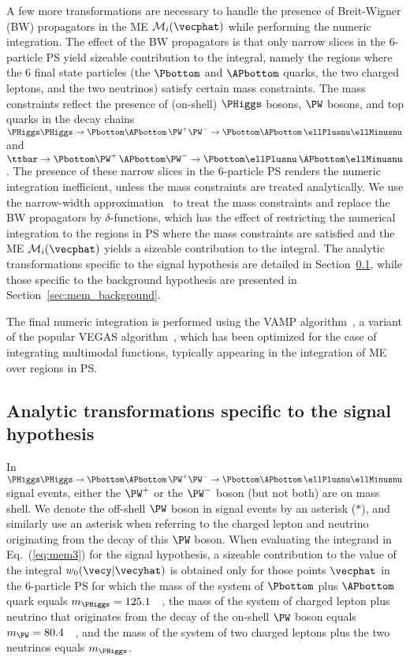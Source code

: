 A few more transformations are necessary to handle the presence of Breit-Wigner (BW) propagators in the ME $\mathcal{M}_{i}(\vecphat)$ while performing the numeric integration.
The effect of the BW propagators is that only narrow slices in the $6$-particle PS yield sizeable contribution to the integral,
namely the regions where the $6$ final state particles (the $\Pbottom$ and $\APbottom$ quarks, the two charged leptons, and the two neutrinos)
satisfy certain mass constraints.
The mass constraints reflect the presence of (on-shell) $\PHiggs$ bosons, $\PW$ bosons, and top quarks in the decay chains
$\PHiggs\PHiggs \to \Pbottom\APbottom \, \PW^{+}\PW^{-} \to \Pbottom\APbottom \, \ellPlusnu\ellMinusnu$ and
$\ttbar \to \Pbottom\PW^{+} \, \APbottom\PW^{-} \to \Pbottom\ellPlusnu \, \APbottom\ellMinusnu$.
The presence of these narrow slices in the $6$-particle PS renders the numeric integration inefficient, unless the mass constraints are treated analytically.
We use the narrow-width approximation~\cite{NWA} to treat the mass constraints and replace the BW propagators by $\delta$-functions,
which has the effect of restricting the numerical integration to the regions in PS where the mass constraints are satisfied
and the ME $\mathcal{M}_{i}(\vecphat)$ yields a sizeable contribution to the integral.
The analytic transformations specific to the signal hypothesis are detailed in Section~\ref{sec:mem_signal},
while those specific to the background hypothesis are presented in Section~\ref{sec:mem_background}.

The final numeric integration is performed using the VAMP algorithm~\cite{VAMP}, a variant of the popular VEGAS algorithm~\cite{VEGAS},
which has been optimized for the case of integrating multimodal functions, typically appearing in the integration of ME over regions in PS.


\subsection{Analytic transformations specific to the signal hypothesis}
\label{sec:mem_signal}

In $\PHiggs\PHiggs \to \Pbottom\APbottom \, \PW^{+}\PW^{-} \to \Pbottom\APbottom \, \ellPlusnu\ellMinusnu$ signal events,
either the $\PW^{+}$ or the $\PW^{-}$ boson (but not both) are on mass shell.
We denote the off-shell $\PW$ boson in signal events by an asterisk ($\ast$),
and similarly use an asterisk when referring to the charged lepton and neutrino originating from the decay of this $\PW$ boson.
When evaluating the integrand in Eq.~(\ref{eq:mem3}) for the signal hypothesis, 
a sizeable contribution to the value of the integral $w_{0}(\vecy|\vecyhat)$ is obtained only for those points $\vecphat$ in the $6$-particle PS for which
the mass of the system of $\Pbottom$ plus $\APbottom$ quark equals $m_{\PHiggs} = 125.1$~\GeV~\cite{HIG-14-042},
the mass of the system of charged lepton plus neutrino that originates from the decay of the on-shell $\PW$ boson equals $m_{\PW} = 80.4$~\GeV~\cite{PDG},
and the mass of the system of two charged leptons plus the two neutrinos equals $m_{\PHiggs}$.


